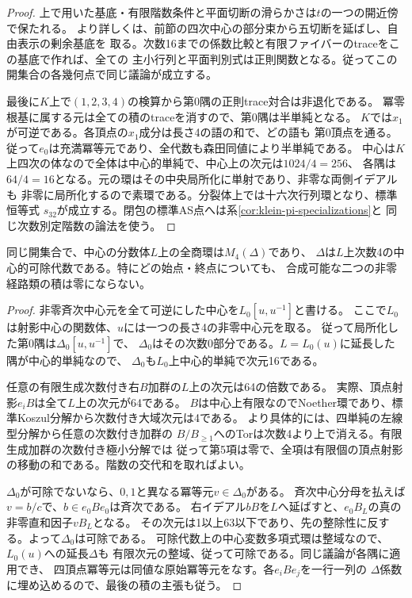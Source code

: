 \begin{proof}
上で用いた基底・有限階数条件と平面切断の滑らかさは$t$の一つの開近傍で保たれる。
より詳しくは、前節の四次中心の部分束から五切断を延ばし、自由表示の剰余基底を
取る。次数16までの係数比較と有限ファイバーのtraceをこの基底で作れば、全ての
主小行列と平面判別式は正則関数となる。従ってこの開集合の各幾何点で同じ議論が成立する。

最後に$K$上で$(1,2,3,4)$の検算から第0隅の正則trace対合は非退化である。
冪零根基に属する元は全ての積のtraceを消すので、第0隅は半単純となる。
$K$では$x_1$が可逆である。各頂点の$x_1$成分は長さ4の語の和で、どの語も
第0頂点を通る。従って$e_0$は充満冪等元であり、全代数も森田同値により半単純である。
中心は$K$上四次の体なので全体は中心的単純で、中心上の次元は$1024/4=256$、
各隅は$64/4=16$となる。元の環はその中央局所化に単射であり、非零な両側イデアルも
非零に局所化するので素環である。分裂体上では十六次行列環となり、標準恒等式
$s_{32}$が成立する。閉包の標準AS点へは系\ref{cor:klein-pi-specializations}と
同じ次数別定階数の論法を使う。
\end{proof}

\begin{corollary}\label{cor:quartic-division-corners}
同じ開集合で、中心の分数体$L$上の全商環は$M_4(\Delta)$であり、
$\Delta$は$L$上次数4の中心的可除代数である。特にどの始点・終点についても、
合成可能な二つの非零経路類の積は零にならない。
\end{corollary}
\begin{proof}
非零斉次中心元を全て可逆にした中心を$L_0[u,u^{-1}]$と書ける。
ここで$L_0$は射影中心の関数体、$u$には一つの長さ4の非零中心元を取る。
従って局所化した第0隅は$\Delta_0[u,u^{-1}]$で、
$\Delta_0$はその次数0部分である。$L=L_0(u)$に延長した隅が中心的単純なので、
$\Delta_0$も$L_0$上中心的単純で次元16である。

任意の有限生成次数付き右$B$加群の$L$上の次元は64の倍数である。
実際、頂点射影$e_iB$は全て$L$上の次元が64である。
$B$は中心上有限なのでNoether環であり、標準Koszul分解から次数付き大域次元は4である。
より具体的には、四単純の左線型分解から任意の次数付き加群の
$B/B_{\ge1}$へのTorは次数4より上で消える。有限生成加群の次数付き極小分解では
従って第5項は零で、全項は有限個の頂点射影の移動の和である。階数の交代和を取ればよい。

$\Delta_0$が可除でないなら、$0,1$と異なる冪等元$v\in\Delta_0$がある。
斉次中心分母を払えば$v=b/c$で、$b\in e_0Be_0$は斉次である。
右イデアル$bB$を$L$へ延ばすと、$e_0 B_L$の真の非零直和因子$v B_L$となる。
その次元は1以上63以下であり、先の整除性に反する。よって$\Delta_0$は可除である。
可除代数上の中心変数多項式環は整域なので、$L_0(u)$への延長$\Delta$も
有限次元の整域、従って可除である。同じ議論が各隅に適用でき、
四頂点冪等元は同値な原始冪等元をなす。各$e_i B e_j$を一行一列の
$\Delta$係数に埋め込めるので、最後の積の主張も従う。
\end{proof}
